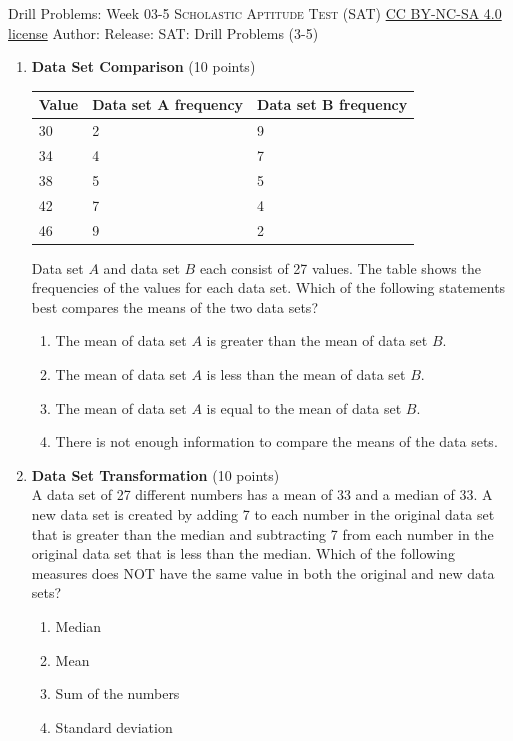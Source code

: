 \newpage\handout
{Drill Problems: Week 03-5}
{\textsc{Scholastic Aptitude Test (SAT)}}
{\href{https://creativecommons.org/licenses/by-nc-sa/4.0/}{CC BY-NC-SA 4.0 license}}
{Author: \BookAuthor}{Release: \generatedOn}
{SAT: Drill Problems (3-5)}


\begin{enumerate}
  \item \textbf{Data Set Comparison} (10 points)\\
  \begin{center}
  \begin{tabular}{|l|l|l|}
  \hline
  \textbf{Value} & \textbf{Data set A frequency} & \textbf{Data set B frequency} \\
  \hline
  30 & 2 & 9 \\
  \hline
  34 & 4 & 7 \\
  \hline
  38 & 5 & 5 \\
  \hline
  42 & 7 & 4 \\
  \hline
  46 & 9 & 2 \\
  \hline
  \end{tabular}
  \end{center}

  Data set $A$ and data set $B$ each consist of 27 values. The table shows the frequencies of the values for each data set. Which of the following statements best compares the means of the two data sets?
  \begin{enumerate}[label=(\Alph*)]
    \item The mean of data set $A$ is greater than the mean of data set $B$.
    \item The mean of data set $A$ is less than the mean of data set $B$.
    \item The mean of data set $A$ is equal to the mean of data set $B$.
    \item There is not enough information to compare the means of the data sets.
  \end{enumerate}
  \begin{subanswer}
  \end{subanswer}

  \item \textbf{Data Set Transformation} (10 points)\\
  A data set of 27 different numbers has a mean of 33 and a median of 33. A new data set is created by adding 7 to each number in the original data set that is greater than the median and subtracting 7 from each number in the original data set that is less than the median. Which of the following measures does NOT have the same value in both the original and new data sets?
  \begin{enumerate}[label=(\Alph*)]
    \item Median
    \item Mean
    \item Sum of the numbers
    \item Standard deviation
  \end{enumerate}
  \begin{subanswer}
  \end{subanswer}


\end{enumerate}
